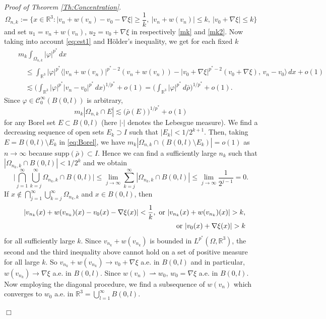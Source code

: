\documentclass[12pt,leqno,twoside]{amsart}
\newenvironment{altproof}[1]
{\noindent%
{\em Proof of {#1}}.}
{\nopagebreak\mbox{}\hfill $\Box$\par\addvspace{0.5cm}}
\newcommand{\vp}{\varphi}
\def\supp{\mathrm{supp}}
\def\R{\mathbb{R}}
\newcommand{\cC}{{\mathcal C}}
\newcommand{\Om}{\Omega}
\def\vp{\varphi}
\newcommand{\weakto}{\rightharpoonup}
\numberwithin{equation}{section}
\begin{document}
\begin{altproof}{Theorem \ref{Th:Concentration}}
$$	\Omega_{n,k}:=\Big\{x\in \R^3: |v_n+w(v_n)-v_0-\nabla\xi|\geq  \frac1k, \ |v_n+w(v_n)|\le k,\ |v_0+\nabla\xi|\le k \Big\}
	$$
	and set $u_1=v_n+w(v_n)$, $u_2 = v_0+\nabla\xi$ in respectively \eqref{mk} and \eqref{mk2}. Now  taking into account \eqref{eq:est1} and H\"older's inequality, we get for each fixed $k$
	\begin{eqnarray*}
		&&m_k\int_{\Omega_{n,k}}|\vp|^{p^*}\,dx \\ 
		&& \quad \le \int_{\R^3}|\vp|^{p^*}\langle |v_n+w(v_n)|^{p^*-2}(v_n+w(v_n))-|v_0+\nabla\xi|^{p^*-2}(v_0+\nabla\xi), \, v_n-v_0\rangle \,dx +o(1)\\
		&& \quad \lesssim \Big(\int_{\R^3}|\vp|^{p^*}|v_n-v_0|^{p^*}\,dx\Big)^{1/p^*} +o(1) = 
		 \Big(\int_{\R^3}|\vp|^{p^*}\,d\bar{\rho}\Big)^{1/p^*}+o(1).
	\end{eqnarray*} 
	Since $\vp\in\cC_0^{\infty}(B(0,l))$ is arbitrary, 
	\begin{equation}\label{eq:Borel}
	m_k|\Omega_{n,k}\cap E|\lesssim \big(\bar{\rho}(E)\big)^{1/p^*}+o(1)
	\end{equation}
	for any Borel set $E\subset B(0,l)$ (here $|\cdot|$ denotes the Lebesgue measure). We find a decreasing sequence of open sets $E_k\supset I$ such that $|E_k|<1/2^{k+1}$. Then, taking $E=B(0,l)\setminus E_k$ in \eqref{eq:Borel}, we have
	$m_k|\Omega_{n,k}\cap (B(0,l)\setminus E_k)|=o(1)$ as $n\to\infty$ because $\supp(\bar\rho)\subset I$. Hence 
	we can find a sufficiently large $n_k$ such that $|\Omega_{n_k,k}\cap B(0,l)|<1/2^k$ and we obtain
	$$\Big|\bigcap_{j=1}^{\infty}\bigcup_{k=j}^{\infty}\Omega_{n_k,k}\cap B(0,l)\Big| \le \lim_{j\to\infty}\sum_{k=j}^{\infty}|\Omega_{n_k,k}\cap B(0,l)|\leq \lim_{j\to\infty}\frac{1}{2^{j-1}}=0.$$
	If $x\notin \bigcap_{j=1}^{\infty}\bigcup_{k=j}^{\infty}\Omega_{n_k,k}$ and $x\in B(0,l)$, then
	\begin{eqnarray*}
		&&|v_{n_k}(x)+w(v_{n_k})(x)-v_0(x)-\nabla\xi(x)|< \frac1k,\hbox{ or }|v_{n_k}(x)+ w(v_{n_k})(x)|>k,\\
		&&\hbox{ or }|v_0(x)+\nabla\xi(x)|> k
	\end{eqnarray*}
	for all sufficiently large $k$. Since $v_{n_k}+w(v_{n_k})$ is bounded in $L^{p^*}(\Om,\R^3)$, the second and the third inequality above cannot hold on a set of positive measure for all large $k$. 
	So $v_{n_k}+w(v_{n_k})\to v_0+\nabla\xi$ a.e. in $B(0,l)$ and in particular, $w(v_{n_k})\to \nabla\xi$  a.e. in $B(0,l)$. Since $w(v_n)\weakto w_0$, $w_0=\nabla \xi$ a.e. in $B(0,l)$. Now employing the diagonal procedure, we find a subsequence of $w(v_n)$ which converges to $w_0$ a.e. in $\R^3=\bigcup_{l=1}^{\infty}B(0,l)$. 
	

\end{altproof}
\end{document}

